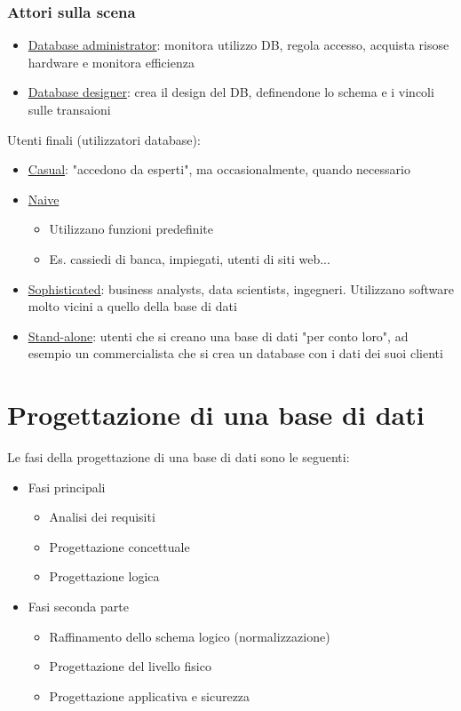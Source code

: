 \subsubsection*{Attori sulla scena}
\begin{itemize}
	\item  \underline{Database administrator}: monitora utilizzo DB, regola accesso, acquista risose hardware e monitora efficienza
	\item \underline{Database designer}: crea il design del DB, definendone lo schema e i vincoli sulle transaioni
\end{itemize}
Utenti finali (utilizzatori database):
\begin{itemize}
	\item  \underline{Casual}: "accedono da esperti", ma occasionalmente, quando necessario
	\item \underline{Naive}
	      \begin{itemize}
		      \item Utilizzano funzioni predefinite
		      \item Es. cassiedi di banca, impiegati, utenti di siti web...
	      \end{itemize}
	\item \underline{Sophisticated}: business analysts, data scientists, ingegneri. Utilizzano software molto vicini a quello della base di dati
	\item \underline{Stand-alone}: utenti che si creano una base di dati "per conto loro", ad esempio un commercialista che si crea un database con i dati dei suoi clienti
\end{itemize}
\section{Progettazione di una base di dati}
Le fasi della progettazione di una base di dati sono le seguenti:
\begin{itemize}
	\item Fasi principali
	      \begin{itemize}
		      \item Analisi dei requisiti
		      \item Progettazione concettuale
		      \item Progettazione logica
	      \end{itemize}
	\item Fasi seconda parte
	      \begin{itemize}
		      \item Raffinamento dello schema logico (normalizzazione)
		      \item Progettazione del livello fisico
		      \item Progettazione applicativa e sicurezza
	      \end{itemize}
\end{itemize}

